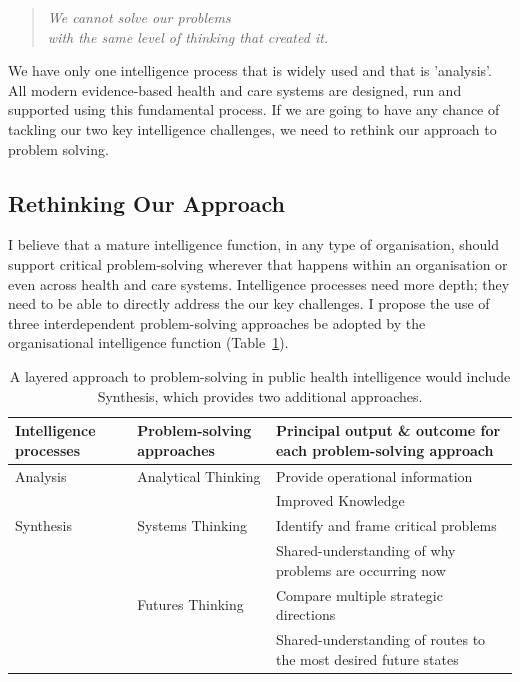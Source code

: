 \begin{quote}
	\centering 
	\emph{We cannot solve our problems}\\ 
	\emph{with the same level of thinking that created it.}
\end{quote}

We have only one intelligence process that is widely used and that is 'analysis'. All modern evidence-based health and care systems are designed, run and supported using this fundamental process. If we are going to have any chance of tackling our two key intelligence challenges, we need to rethink our approach to problem solving.


\subsection{Rethinking Our Approach}

I believe that a mature intelligence function, in any type of organisation, should support critical problem-solving wherever that happens within an organisation or even across health and care systems. Intelligence processes need more depth; they need to be able to directly address the our key challenges. I propose the use of three interdependent problem-solving approaches be adopted by the organisational intelligence function (Table~\ref{tab:response}).

\begin{table}[h]
	\begin{center}
		\footnotesize%
		\begin{tabular}{p{1.75cm} p{2.75cm} p{4.75cm}}
			\toprule
			Intelligence processes & Problem-solving approaches & Principal output \& outcome for each problem-solving approach \\
			\midrule
			Analysis    & Analytical Thinking & Provide operational information\\
			& & Improved Knowledge \\
			Synthesis & Systems Thinking & Identify and frame critical problems \\
			& & Shared-understanding of why problems are occurring now \\
			& Futures Thinking & Compare multiple strategic directions \\
			& & Shared-understanding of routes to the most desired future states \\
			\bottomrule
		\end{tabular}
	\end{center}
	\caption{A layered approach to problem-solving in public health intelligence would include Synthesis, which provides two additional approaches.}
	\label{tab:response}
\end{table}

